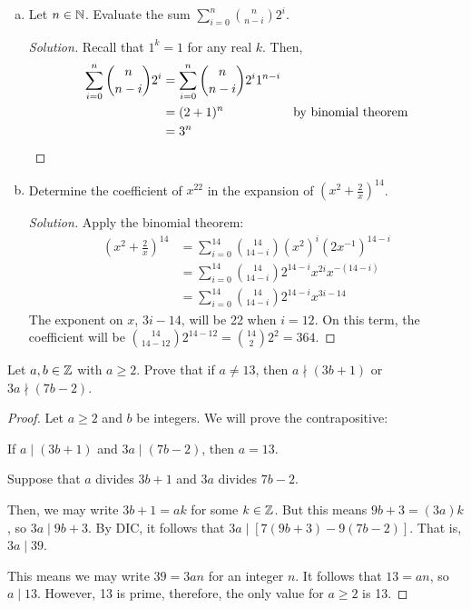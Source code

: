 \question \begin{enumerate}[(a)]
  \item Let $n\in\mathbb{N}$. Evaluate the sum $\displaystyle\sum_{i=0}^n\binom{n}{n-i}2^i$.
        \begin{proof}[Solution]
          Recall that $1^k=1$ for any real $k$. Then,
          \begin{align*}
            \sum_{i=0}^n\binom{n}{n-i}2^i & = \sum_{i=0}^n\binom{n}{n-i}2^i 1^{n-i} \\
                                          & = (2+1)^n & \text{by binomial theorem}         \\
                                          & = 3^n \qedhere
          \end{align*}
        \end{proof}
  \item Determine the coefficient of $x^{22}$ in the expansion of $\left(x^2+\frac{2}{x}\right)^{14}$.
        \begin{proof}[Solution]
          Apply the binomial theorem:
          \begin{align*}
            \left(x^2+\frac{2}{x}\right)^{14} & = \sum_{i=0}^{14}\binom{14}{14-i}(x^2)^i (2x^{-1})^{14-i} \\
                                              & =\sum_{i=0}^{14}\binom{14}{14-i}2^{14-i}x^{2i}x^{-(14-i)} \\
                                              & =\sum_{i=0}^{14}\binom{14}{14-i}2^{14-i}x^{3i-14}
          \end{align*}
          The exponent on $x$, $3i-14$, will be 22 when $i=12$.
          On this term, the coefficient will be $\binom{14}{14-12}2^{14-12} = \binom{14}{2}2^2 = 364$.
        \end{proof}
\end{enumerate}


\question Let $a,b\in\mathbb{Z}$ with $a \geq 2$.
Prove that if $a \neq 13$, then $a \nmid (3b+1)$ or $3a \nmid (7b-2)$.
\begin{proof}
  Let $a \geq 2$ and $b$ be integers.
  We will prove the contrapositive:
  \begin{center}
    If $a \mid (3b+1)$ and $3a \mid (7b-2)$, then $a = 13$.
  \end{center}
  Suppose that $a$ divides $3b+1$ and $3a$ divides $7b-2$.

  Then, we may write $3b+1 = ak$ for some $k\in\mathbb{Z}$.
  But this means $9b+3 = (3a)k$, so $3a \mid 9b+3$.
  By DIC, it follows that $3a \mid [7(9b+3)-9(7b-2)]$.
  That is, $3a \mid 39$.

  This means we may write $39 = 3an$ for an integer $n$.
  It follows that $13 = an$, so $a \mid 13$.
  However, 13 is prime, therefore, the only value for $a \geq 2$ is 13.
\end{proof}


